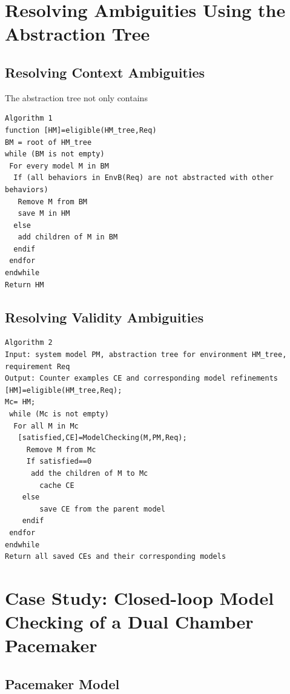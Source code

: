 \section{Resolving Ambiguities Using the Abstraction Tree}
\subsection{Resolving Context Ambiguities}
The abstraction tree not only contains
\begin{Verbatim}
Algorithm 1
function [HM]=eligible(HM_tree,Req)
BM = root of HM_tree
while (BM is not empty)
 For every model M in BM
  If (all behaviors in EnvB(Req) are not abstracted with other behaviors)
   Remove M from BM
   save M in HM
  else
   add children of M in BM
  endif
 endfor
endwhile
Return HM
\end{Verbatim}
\subsection{Resolving Validity Ambiguities}

\begin{Verbatim}
Algorithm 2
Input: system model PM, abstraction tree for environment HM_tree, requirement Req
Output: Counter examples CE and corresponding model refinements
[HM]=eligible(HM_tree,Req);
Mc= HM;
 while (Mc is not empty)
  For all M in Mc
   [satisfied,CE]=ModelChecking(M,PM,Req);
	 Remove M from Mc
	 If satisfied==0
	  add the children of M to Mc
		cache CE
	else
		save CE from the parent model
	endif
 endfor
endwhile
Return all saved CEs and their corresponding models
\end{Verbatim}



\section{Case Study: Closed-loop Model Checking of a Dual Chamber Pacemaker}
\subsection{Pacemaker Model}
